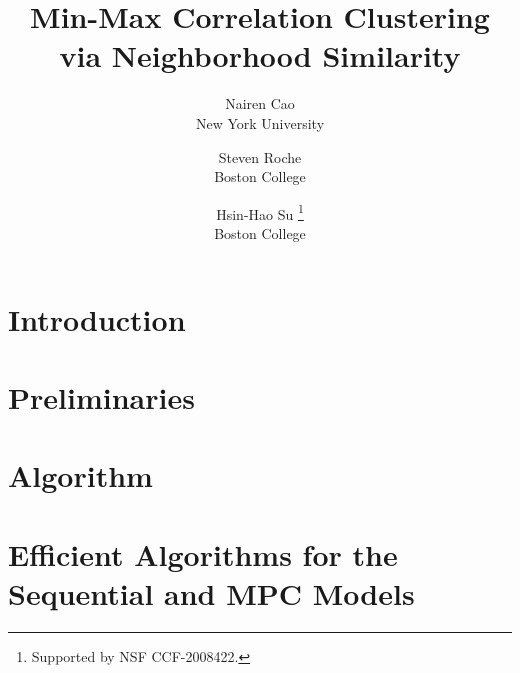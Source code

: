 \documentclass[11pt]{article}
\begin{document}
\newcommand\relatedversion{}
\renewcommand\relatedversion{\thanks{This work is supported by NSF CCF-2008422.}} %


\title{\Large Min-Max Correlation Clustering via Neighborhood Similarity}
\author{Nairen Cao\\
New York University\and 
Steven Roche\\
Boston College\and
Hsin-Hao Su \thanks{Supported by NSF CCF-2008422.}\\
Boston College 
}

\date{}

\maketitle



\begin{abstract}\small %


\end{abstract}
\sloppy
\section{Introduction}


% 
\section{Preliminaries}


\section{Algorithm}


\section{Efficient Algorithms for the Sequential and MPC Models} \label{sec:efficientimplementation}

\end{document}
